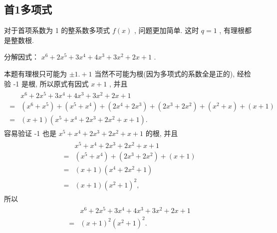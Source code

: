 \subsection{首1多项式}
对于首项系数为 1 的整系数多项式 $f(x)$ , 问题更加简单. 这时 $q=1$ , 有理根都是整数根.

\begin{example}
	分解因式： $x^{6}+2 x^{5}+3 x^{4}+4 x^{3}+3 x^{2}+2 x+1$ .
\end{example}
\begin{solution}
	本题有理根只可能为 $\pm 1 .+1$ 当然不可能为根(因为多项式的系数全是正的), 经检验 -1 是根, 所以原式有因式 $x+1$ , 并且
	\begin{align*}
		\begin{aligned}
			  & x^{6}+2 x^{5}+3 x^{4}+4 x^{3}+3 x^{2}+2 x+1                                                                                            \\
			= & \left(x^{6}+x^{5}\right)+\left(x^{5}+x^{4}\right)+\left(2 x^{4}+2 x^{3}\right)+\left(2 x^{3}+2 x^{2}\right)+\left(x^{2}+x\right)+(x+1) \\
			= & (x+1)\left(x^{5}+x^{4}+2 x^{3}+2 x^{2}+x+1\right) .
		\end{aligned}
	\end{align*}
	容易验证 -1 也是 $x^{5}+x^{4}+2 x^{3}+2 x^{2}+x+1$ 的根, 并且
	\begin{align*}
		\begin{aligned}
			  & x^{5}+x^{4}+2 x^{3}+2 x^{2}+x+1                             \\
			= & \left(x^{5}+x^{4}\right)+\left(2 x^{3}+2 x^{2}\right)+(x+1) \\
			= & (x+1)\left(x^{4}+2 x^{2}+1\right)                           \\
			= & (x+1)\left(x^{2}+1\right)^{2},
		\end{aligned}
	\end{align*}
	所以
	\begin{align*}
		\begin{aligned}
			  & x^{6}+2 x^{5}+3 x^{4}+4 x^{3}+3 x^{2}+2 x+1 \\
			= & (x+1)^{2}\left(x^{2}+1\right)^{2} .
		\end{aligned}
	\end{align*}
\end{solution}


